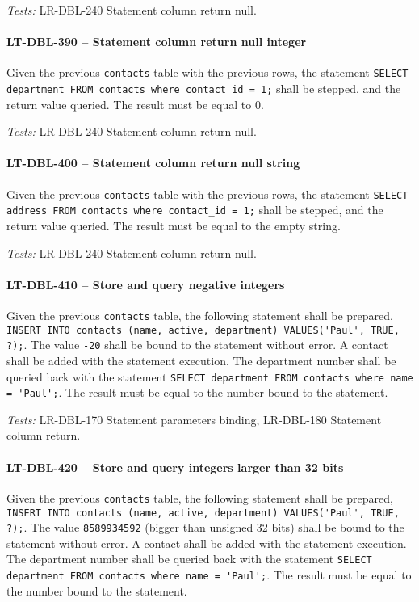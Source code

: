 \textit{Tests: } LR-DBL-240 Statement column return null.

\paragraph{LT-DBL-390 -- Statement column return null integer}
Given the previous \lstinline{contacts} table with the previous rows,
the statement \lstinline{SELECT department FROM contacts where contact_id = 1;}
shall be stepped, and the return value queried. The result must be equal to
0.

\textit{Tests: } LR-DBL-240 Statement column return null.

\paragraph{LT-DBL-400 -- Statement column return null string}
Given the previous \lstinline{contacts} table with the previous rows,
the statement \lstinline{SELECT address FROM contacts where contact_id = 1;}
shall be stepped, and the return value queried. The result must be equal to
the empty string.

\textit{Tests: } LR-DBL-240 Statement column return null.

\paragraph{LT-DBL-410 -- Store and query negative integers}
Given the previous \lstinline{contacts} table,
the following statement shall be prepared,
\lstinline{INSERT INTO contacts (name, active, department) VALUES('Paul', TRUE, ?);}.
The value \lstinline{-20} shall be bound to the statement without error.
A contact shall be added with the statement execution.
The department number shall be queried back with the statement
\lstinline{SELECT department FROM contacts where name = 'Paul';}.
The result must be equal to the number bound to the statement.

\textit{Tests: } LR-DBL-170 Statement parameters binding, LR-DBL-180 Statement
column return.

\paragraph{LT-DBL-420 -- Store and query integers larger than 32 bits}
Given the previous \lstinline{contacts} table,
the following statement shall be prepared,
\lstinline{INSERT INTO contacts (name, active, department) VALUES('Paul', TRUE, ?);}.
The value \lstinline{8589934592} (bigger than unsigned 32 bits)
shall be bound to the statement without error.
A contact shall be added with the statement execution.
The department number shall be queried back with the statement
\lstinline{SELECT department FROM contacts where name = 'Paul';}.
The result must be equal to the number bound to the statement.

